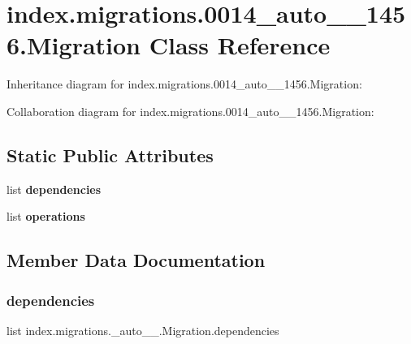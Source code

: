 \hypertarget{classindex_1_1migrations_1_10014__auto__20171024__1456_1_1Migration}{}\section{index.\+migrations.0014\+\_\+auto\+\_\+\_\+1456.Migration Class Reference}
\label{classindex_1_1migrations_1_10014__auto__20171024__1456_1_1Migration}


Inheritance diagram for index.\+migrations.0014\+\_\+auto\+\_\+\_\+1456.Migration\+:


Collaboration diagram for index.\+migrations.0014\+\_\+auto\+\_\+\_\+1456.Migration\+:
\subsection*{Static Public Attributes}
\begin{DoxyCompactItemize}
\item 
list {\bfseries dependencies}
\item 
list {\bfseries operations}
\end{DoxyCompactItemize}


\subsection{Member Data Documentation}
\mbox{\label{classindex_1_1migrations_1_10014__auto__20171024__1456_1_1Migration_a6742f61e95da79043639e1861de8a6e6}} 
\subsubsection{\texorpdfstring{dependencies}{dependencies}}
{\footnotesize\ttfamily list index.\+migrations.\+\_\+auto\+\_\+\_.\+Migration.\+dependencies\hspace{0.3cm}{\ttfamily [static]}}


